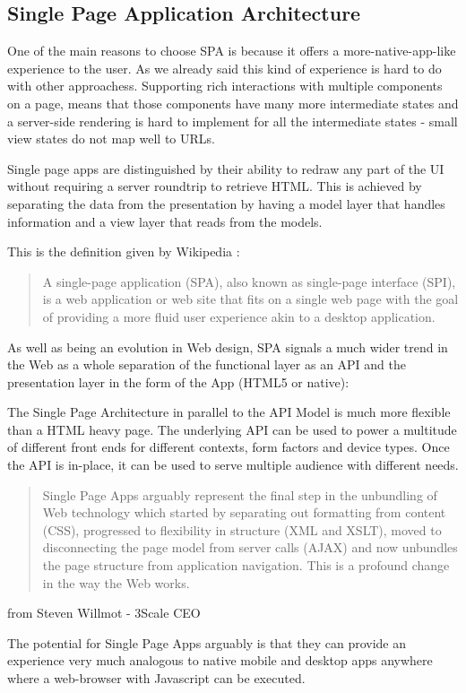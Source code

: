 \documentclass[a4paper,13pt]{report}
\begin{document}
\subsection{Single Page Application Architecture}
 One of the main reasons to choose SPA is because it offers a more-native-app-like experience to the user. As we already said this kind of experience  is hard to do with other approachess.
 Supporting rich interactions with multiple components on a page, means that those components have many more intermediate states and a server-side rendering is hard to implement for all the intermediate states - small view states do not map well to URLs.

Single page apps are distinguished by their ability to redraw any part of the UI without requiring a server roundtrip to retrieve HTML. This is achieved by separating the data from the presentation by having a model layer that handles information and a view layer that reads from the models.


This is the definition given by Wikipedia \cite{SPAWikipedia}:
\begin{quotation}
A single-page application (SPA), also known as single-page interface (SPI), is a web application or web site that fits on a single web page with the goal of providing a more fluid user experience akin to a desktop application.
\end{quotation}


As well as being an evolution in Web design, SPA signals a much wider trend in the Web as a whole separation of the functional layer as an API and the presentation layer in the form of the App (HTML5 or native):

The Single Page Architecture in parallel to the API Model is much more flexible than a HTML heavy page. The underlying API can be used to power a multitude of different front ends for different contexts, form factors and device types. Once the API is in-place, it can be used to serve multiple audience with different needs. \newline
\begin{quotation}
Single Page Apps arguably represent the final step in the unbundling of Web technology which started by separating out formatting from content (CSS), progressed to flexibility in structure (XML and XSLT), moved to disconnecting the page model from server calls (AJAX) and now unbundles the page structure from application navigation. This is a profound change in the way the Web works.
\end{quotation}
\begin{flushright}
from Steven Willmot - 3Scale CEO\cite{appification}
\end{flushright}
The potential for Single Page Apps arguably is that they can provide an experience very much analogous to native mobile and desktop apps anywhere where a web-browser with Javascript can be executed.
\end{document}
